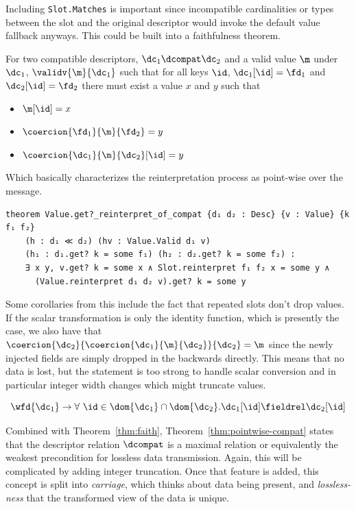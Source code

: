 Including \texttt{Slot.Matches} is important since incompatible cardinalities or
types between the slot and the original descriptor would invoke the default
value fallback anyways. This could be built into a faithfulness theorem.

\vspace{1em}
\begin{theorem}[Faithfulness]\label{thm:faith}
  For two compatible descriptors, $\dc_1 \dcompat \dc_2$ and a valid value $\m$ under
  $\dc_1$, $\validv{\m}{\dc_1}$ such that for all keys $\id$, $\dc_1[\id] = \fd_1$ and $\dc_2[\id] =
  \fd_2$ there must exist a value $x$ and $y$ such that
  \begin{itemize}
  \item $\m[\id] = x$
  \item $\coercion{\fd_1}{\m}{\fd_2} = y$
  \item $\coercion{\dc_1}{\m}{\dc_2}[\id] = y$
  \end{itemize}
\end{theorem}

Which basically characterizes the reinterpretation process as point-wise over the
message.

\begin{verbatim}
theorem Value.get?_reinterpret_of_compat {d₁ d₂ : Desc} {v : Value} {k f₁ f₂}
    (h : d₁ ≪ d₂) (hv : Value.Valid d₁ v)
    (h₁ : d₁.get? k = some f₁) (h₂ : d₂.get? k = some f₂) :
    ∃ x y, v.get? k = some x ∧ Slot.reinterpret f₁ f₂ x = some y ∧
      (Value.reinterpret d₁ d₂ v).get? k = some y
\end{verbatim}

Some corollaries from this include the fact that repeated slots don't drop
values. If the scalar transformation is only the identity function, which is
presently the case, we also have that
$\coercion{\dc_2}{\coercion{\dc_1}{\m}{\dc_2}}{\dc_{2}} = \m$ since the newly injected
fields are simply dropped in the backwards directly. This means that no data is
lost, but the statement is too strong to handle scalar conversion and in
particular integer width changes which might truncate values.

\vspace{1em}
\begin{theorem}\label{thm:pointwise-compat}
  \[ \wfd{\dc_1} \rightarrow \forall\ \id \in \dom{\dc_1} \cap \dom{\dc_2}. \dc_1[\id] \fieldrel \dc_2[\id] \]
\end{theorem}

Combined with Theorem~\ref{thm:faith}, Theorem~\ref{thm:pointwise-compat} states
that the descriptor relation $\dcompat$ is a maximal relation or equivalently
the weakest precondition for lossless data transmission. Again, this will be
complicated by adding integer truncation. Once that feature is added, this
concept is split into \emph{carriage}, which thinks about data being present,
and \emph{lossless-ness} that the transformed view of the data is unique.

